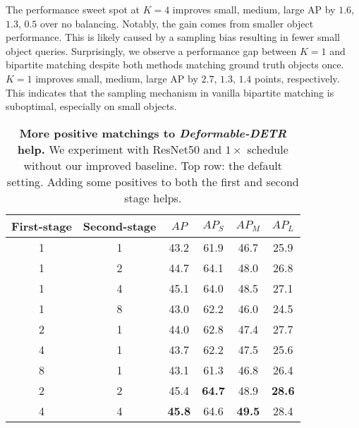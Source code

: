 \documentclass[10pt,twocolumn,letterpaper]{article}
\newcommand{\ddetr}{{\textit{Deformable-DETR}}\xspace}
\newcommand{\lbltbl}[1]{\label{tbl:#1}}
\begin{document}
The performance sweet spot at $K=4$ improves small, medium, large AP by $1.6$, $1.3$, $0.5$ over no balancing.
Notably, the gain comes from smaller object performance.
This is likely caused by a sampling bias resulting in fewer small object queries.
Surprisingly, we observe a performance gap between $K=1$ and bipartite matching despite both methods matching ground truth objects once.
$K=1$ improves small, medium, large AP by $2.7$, $1.3$, $1.4$ points, respectively.
This indicates that the sampling mechanism in vanilla bipartite matching is suboptimal, especially on small objects.

\begin{table}
\centering
\begin{tabular}{@{}c@{\ }c@{\ \ \ }c@{\ \ \ \ \ \ }c@{\ \ \ \ \ \ }c@{\ \ \ \ \ \ }c@{}}
\toprule
  First-stage & Second-stage & $AP$ & $AP_S$ & $AP_M$ & $AP_L$ \\
\midrule
1 & 1 & 43.2 & 61.9 & 46.7 & 25.9 \\
\midrule
1 & 2 & 44.7 & 64.1 & 48.0 & 26.8 \\
1 & 4 & 45.1 & 64.0 & 48.5 & 27.1 \\
1 & 8 & 43.0 & 62.2 & 46.0 & 24.5 \\
\midrule
2 & 1 & 44.0 & 62.8 & 47.4 & 27.7 \\
4 & 1 & 43.7 & 62.2 & 47.5 & 25.6 \\
8 & 1 & 43.1 & 61.3 & 46.8 & 26.4 \\
\midrule
2 & 2 & 45.4 & \textbf{64.7} & 48.9 & \textbf{28.6} \\
4 & 4 & \textbf{45.8} & 64.6 & \textbf{49.5} & 28.4 \\
\bottomrule
\end{tabular}
\caption{\textbf{More positive matchings to \ddetr{} help.}  We experiment with ResNet50 and $1\times$ schedule without our improved baseline. Top row: the default setting. Adding some positives to both the first and second stage helps.
}
\lbltbl{bipartite}
\end{table}
\end{document}
